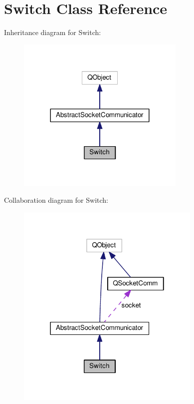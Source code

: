 \hypertarget{class_switch}{}\section{Switch Class Reference}
\label{class_switch}


Inheritance diagram for Switch\+:\nopagebreak
\begin{figure}[H]
\begin{center}
\leavevmode
\includegraphics[width=228pt]{class_switch__inherit__graph}
\end{center}
\end{figure}


Collaboration diagram for Switch\+:\nopagebreak
\begin{figure}[H]
\begin{center}
\leavevmode
\includegraphics[width=250pt]{class_switch__coll__graph}
\end{center}
\end{figure}
